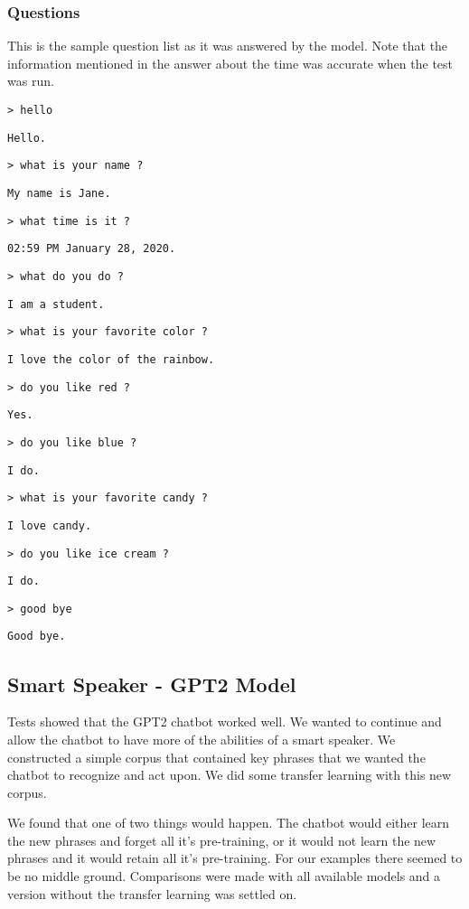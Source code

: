 \subsubsection*{Questions}
This is the sample question list as it was answered by the model. Note that the information mentioned in the answer about the time was accurate when the test was run.

\texttt{> hello}

\texttt{Hello.}

\texttt{> what is your name ?}

\texttt{My name is Jane.}

\texttt{> what time is it ?}

\texttt{02:59 PM January 28, 2020.}

\texttt{> what do you do ?}

\texttt{I am a student.} 

\texttt{> what is your favorite color ?}

\texttt{I love the color of the rainbow.}

\texttt{> do you like red ?}

\texttt{Yes.}

\texttt{> do you like blue ?}

\texttt{I do.}

\texttt{> what is your favorite candy ?}

\texttt{I love candy.}

\texttt{> do you like ice cream ?}

\texttt{I do. }

\texttt{> good bye}

\texttt{Good bye.}



\subsection{Smart Speaker - GPT2 Model}
Tests showed that the GPT2 chatbot worked well. We wanted to continue and allow the chatbot to
have more of the abilities of a smart speaker. We constructed a simple corpus that contained
key phrases that we wanted the chatbot to recognize and act upon. We did some transfer learning
with this new corpus.

We found that one of two things would happen. The chatbot would either learn the new phrases and forget all it's pre-training, or it would not learn the new phrases and it would retain all it's 
pre-training. For our examples there seemed to be no middle ground. Comparisons were made with 
all available models and a version without the transfer learning was settled on.

